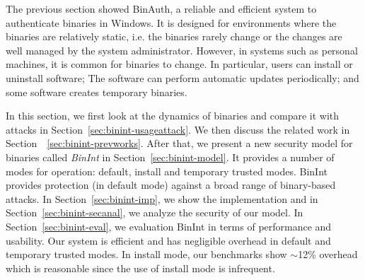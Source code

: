 
The previous section showed BinAuth, a reliable and efficient system
to authenticate binaries in Windows.
It is designed for environments where the binaries are relatively static,
i.e. the binaries rarely change or the changes are well managed by
the system administrator.
However, in systems such as personal machines, it is common for binaries
to change.
In particular, users can install or uninstall software;
The software can perform automatic updates periodically;
and some software creates temporary binaries.

In this section, we first look at the dynamics of binaries and compare
it with attacks in Section~\ref{sec:binint-usageattack}.
We then discuss the related work in Section~~\ref{sec:binint-prevworks}.
After that, we present a new security model for binaries called
{\em BinInt} in Section~\ref{sec:binint-model}.
It provides a number of modes for operation: default, install
and temporary trusted modes.
BinInt provides protection (in default mode) against a broad range of
binary-based attacks.
In Section~\ref{sec:binint-imp}, we show the implementation and
in Section~\ref{sec:binint-secanal}, we analyze the security of our model.
In Section~\ref{sec:binint-eval}, we evaluation BinInt in terms of
performance and usability.
Our system is efficient and has negligible overhead in default and temporary
trusted modes. 
In install mode, our benchmarks
show $\sim$12\% overhead which is reasonable since
the use of install mode is infrequent.

